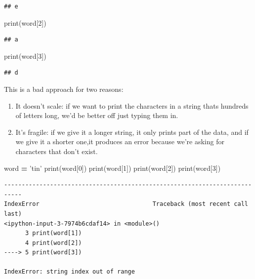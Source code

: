 \documentclass[]{book}
\newenvironment{Shaded}{\begin{snugshade}}{\end{snugshade}}
\newcommand{\BuiltInTok}[1]{#1}
\newcommand{\DecValTok}[1]{\textcolor[rgb]{0.00,0.00,0.81}{#1}}
\newcommand{\NormalTok}[1]{#1}
\newcommand{\OperatorTok}[1]{\textcolor[rgb]{0.81,0.36,0.00}{\textbf{#1}}}
\newcommand{\StringTok}[1]{\textcolor[rgb]{0.31,0.60,0.02}{#1}}
\providecommand{\tightlist}{%
  \setlength{\itemsep}{0pt}\setlength{\parskip}{0pt}}
\theoremstyle{definition}
\theoremstyle{definition}
\theoremstyle{definition}
\theoremstyle{remark}
\begin{document}
\begin{verbatim}
## e
\end{verbatim}

\begin{Shaded}
\begin{Highlighting}[]
\BuiltInTok{print}\NormalTok{(word[}\DecValTok{2}\NormalTok{])}
\end{Highlighting}
\end{Shaded}

\begin{verbatim}
## a
\end{verbatim}

\begin{Shaded}
\begin{Highlighting}[]
\BuiltInTok{print}\NormalTok{(word[}\DecValTok{3}\NormalTok{])}
\end{Highlighting}
\end{Shaded}

\begin{verbatim}
## d
\end{verbatim}

This is a bad approach for two reasons:

\begin{enumerate}
\def\labelenumi{\arabic{enumi}.}
\tightlist
\item
  It doesn't scale: if we want to print the characters in a string thats
  hundreds of letters long, we'd be better off just typing them in.
\item
  It's fragile: if we give it a longer string, it only prints part of
  the data, and if we give it a shorter one,it produces an error because
  we're asking for characters that don't exist.
\end{enumerate}

\begin{Shaded}
\begin{Highlighting}[]
\NormalTok{word }\OperatorTok{=} \StringTok{'tin'}
\BuiltInTok{print}\NormalTok{(word[}\DecValTok{0}\NormalTok{])}
\BuiltInTok{print}\NormalTok{(word[}\DecValTok{1}\NormalTok{])}
\BuiltInTok{print}\NormalTok{(word[}\DecValTok{2}\NormalTok{])}
\BuiltInTok{print}\NormalTok{(word[}\DecValTok{3}\NormalTok{])}
\end{Highlighting}
\end{Shaded}

\begin{verbatim}
---------------------------------------------------------------------------
IndexError                                Traceback (most recent call last)
<ipython-input-3-7974b6cdaf14> in <module>()
      3 print(word[1])
      4 print(word[2])
----> 5 print(word[3])

IndexError: string index out of range
\end{verbatim}
\end{document}
